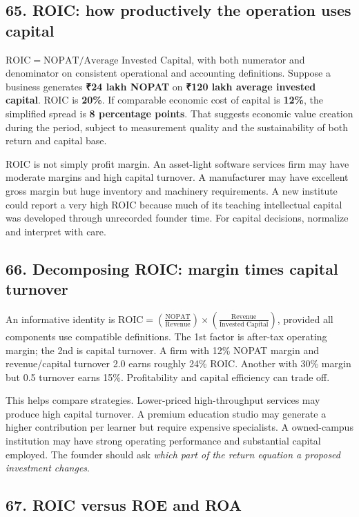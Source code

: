\subsection{65. ROIC: how productively the operation uses capital}


$\mathrm{ROIC} = \mathrm{NOPAT} / \text{Average Invested Capital}$, with both numerator and denominator on consistent operational and accounting definitions. Suppose a business generates \textbf{₹24 lakh NOPAT} on \textbf{₹120 lakh average invested capital}. ROIC is \textbf{20\%}. If comparable economic cost of capital is \textbf{12\%}, the simplified spread is \textbf{8 percentage points}. That suggests economic value creation during the period, subject to measurement quality and the sustainability of both return and capital base.

ROIC is not simply profit margin. An asset-light software services firm may have moderate margins and high capital turnover. A manufacturer may have excellent gross margin but huge inventory and machinery requirements. A new institute could report a very high ROIC because much of its teaching intellectual capital was developed through unrecorded founder time. For capital decisions, normalize and interpret with care.

\subsection{66. Decomposing ROIC: margin times capital turnover}


An informative identity is $\mathrm{ROIC} = \left(\frac{\mathrm{NOPAT}}{\text{Revenue}}\right) \times \left(\frac{\text{Revenue}}{\text{Invested Capital}}\right)$, provided all components use compatible definitions. The 1st factor is after-tax operating margin; the 2nd is capital turnover. A firm with 12\% NOPAT margin and revenue/capital turnover 2.0 earns roughly 24\% ROIC. Another with 30\% margin but 0.5 turnover earns 15\%. Profitability and capital efficiency can trade off.

This helps compare strategies. Lower-priced high-throughput services may produce high capital turnover. A premium education studio may generate a higher contribution per learner but require expensive specialists. A owned-campus institution may have strong operating performance and substantial capital employed. The founder should ask \textit{which part of the return equation a proposed investment changes}.

\subsection{67. ROIC versus ROE and ROA}


